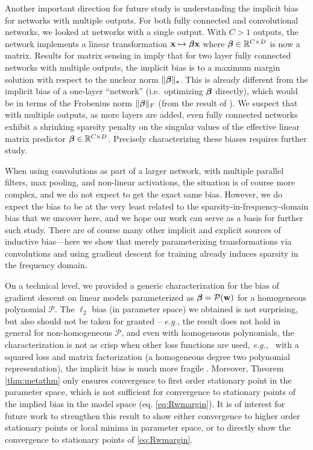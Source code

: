 \documentclass{article}
\renewcommand{\norm}[1]{\lVert #1 \rVert}
\newcommand{\bR}{\mathbb{R}}
\newcommand{\eg}{\textit{e.g.,} }
\renewcommand{\u}[1][]{\ifthenelse{\equal{#1}{}}{\mathbf{w}}{\mathbf{w}^{(#1)}}}
\newcommand{\w}[1][]{\ifthenelse{\equal{#1}{}}{\boldsymbol{\beta}}{\boldsymbol{\beta}^{(#1)}}}
\newcommand{\x}{\mathbf{x}}
\renewcommand{\P}{\mathcal{P}}
\begin{document}
Another important direction for future study is understanding the implicit bias for networks with multiple outputs.  For both fully connected and convolutional networks, we looked at networks with a single output.  With $C>1$ outputs, the network implements a linear transformation $\x\mapsto\w \x$ where $\w\in\bR^{C\times D}$ is now a matrix. Results for matrix sensing in  \citet{gunasekar2018characterizing} imply that for two layer fully connected networks with multiple outputs, the implicit bias is to a maximum margin solution with respect to the nuclear norm $\norm{\w}_\star$.  This is already different from the implicit bias of a one-layer ``network'' (i.e.~optimizing $\w$ directly), which would be in terms of the Frobenius norm $\norm{\w}_F$ (from the result of \citet{soudry2017implicit}).  We suspect that with multiple outputs, as more layers are added, even fully connected networks  exhibit a shrinking sparsity penalty on the singular values of the effective linear matrix predictor $\w\in\bR^{C\times D}$.  Precisely characterizing these biases requires further study.

When using convolutions as part of a larger network, with multiple parallel filters, max pooling, and non-linear activations, the situation is of course more complex, and we do not expect to get the exact same bias.  However, we do expect the bias to be at the very least related to the sparsity-in-frequency-domain bias that we uncover here, and we hope our work can serve as a basis for further such study.  There are of course many other implicit and explicit sources of inductive bias---here we show that merely parameterizing transformations via convolutions and using gradient descent for training already induces sparsity in the frequency domain.

On a technical level, we provided a generic characterization for the bias of gradient descent on linear models parameterized as $\w=\P(\u)$ for a homogeneous polynomial $\P$.  The $\ell_2$ bias (in parameter space) we obtained is not surprising, but also should not be taken for granted -- \eg the result does not hold in general for non-homogeneous $\P$, and even with homogeneous polynomials, the characterization is not as crisp when other loss functions are used, \eg~with a squared loss and matrix factorization (a homogeneous degree two polynomial representation), the implicit bias is much more fragile \cite{gunasekar2017implicit,li2017algorithmic}.  Moreover, Theorem \ref{thm:metathm} only ensures convergence to first order stationary point in the parameter space, which is not sufficient for convergence to stationary points of the implied bias in the model space (eq. \eqref{eq:Rwmargin}). It is of interest for future work to strengthen this result to show either convergence to higher order stationary points or local minima in parameter space, or to directly show the convergence to stationary points of \eqref{eq:Rwmargin}. 
\end{document}
